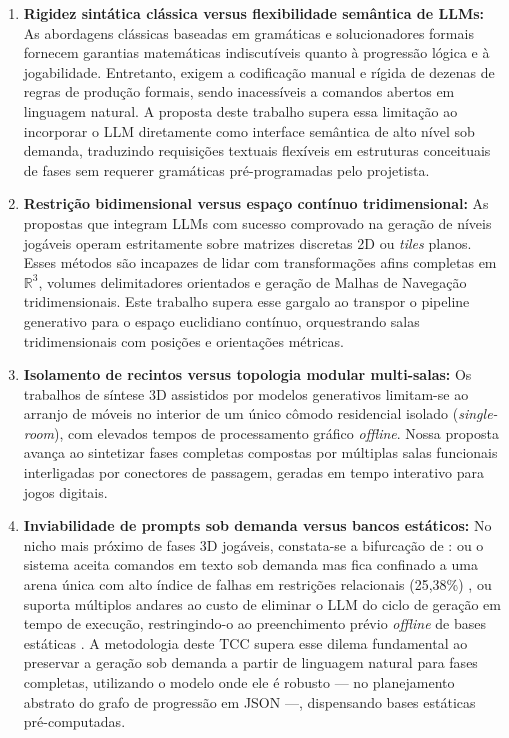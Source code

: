 \begin{enumerate}
    \item \textbf{Rigidez sintática clássica versus flexibilidade semântica de LLMs:} As abordagens clássicas baseadas em gramáticas e solucionadores formais \cite{dormans2010, linden2013designing, tanagra} fornecem garantias matemáticas indiscutíveis quanto à progressão lógica e à jogabilidade. Entretanto, exigem a codificação manual e rígida de dezenas de regras de produção formais, sendo inacessíveis a comandos abertos em linguagem natural. A proposta deste trabalho supera essa limitação ao incorporar o LLM diretamente como interface semântica de alto nível sob demanda, traduzindo requisições textuais flexíveis em estruturas conceituais de fases sem requerer gramáticas pré-programadas pelo projetista.
    
    \item \textbf{Restrição bidimensional versus espaço contínuo tridimensional:} As propostas que integram LLMs com sucesso comprovado na geração de níveis jogáveis \cite{nasir2024word2worldgeneratingstoriesworlds, chen2025narrative} operam estritamente sobre matrizes discretas 2D ou \textit{tiles} planos. Esses métodos são incapazes de lidar com transformações afins completas em $\mathbb{R}^3$, volumes delimitadores orientados e geração de Malhas de Navegação tridimensionais. Este trabalho supera esse gargalo ao transpor o pipeline generativo para o espaço euclidiano contínuo, orquestrando salas tridimensionais com posições e orientações métricas.
    
    \item \textbf{Isolamento de recintos versus topologia modular multi-salas:} Os trabalhos de síntese 3D assistidos por modelos generativos \cite{ocal2024sceneteller, hu2024scenecraft, sun2024roomplanner, feng2026repurposing3dgenerativemodel} limitam-se ao arranjo de móveis no interior de um único cômodo residencial isolado (\textit{single-room}), com elevados tempos de processamento gráfico \textit{offline}. Nossa proposta avança ao sintetizar fases completas compostas por múltiplas salas funcionais interligadas por conectores de passagem, geradas em tempo interativo para jogos digitais.
    
    \item \textbf{Inviabilidade de prompts sob demanda versus bancos estáticos:} No nicho mais próximo de fases 3D jogáveis, constata-se a bifurcação de \textcite{xu2025databasedrivenframework3dlevel, xu2025constraint}: ou o sistema aceita comandos em texto sob demanda mas fica confinado a uma arena única com alto índice de falhas em restrições relacionais (25,38\%) \cite{xu2025constraint}, ou suporta múltiplos andares ao custo de eliminar o LLM do ciclo de geração em tempo de execução, restringindo-o ao preenchimento prévio \textit{offline} de bases estáticas \cite{xu2025databasedrivenframework3dlevel}. A metodologia deste TCC supera esse dilema fundamental ao preservar a geração sob demanda a partir de linguagem natural para fases completas, utilizando o modelo onde ele é robusto --- no planejamento abstrato do grafo de progressão em JSON ---, dispensando bases estáticas pré-computadas.
    

\end{enumerate}
